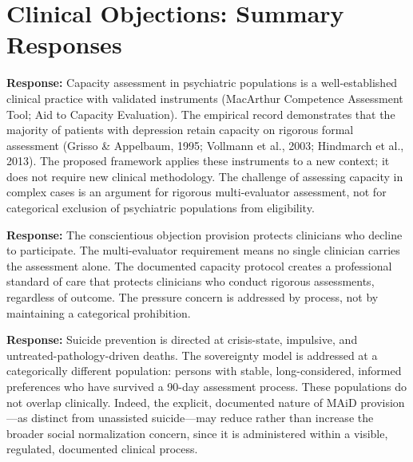 \documentclass[11pt, letterpaper]{article}
\begin{document}
\section{Clinical Objections: Summary Responses}

\begin{objectionbox}[title={\sffamily\bfseries\small\color{C@warning}
  ``We cannot assess capacity reliably in psychiatric populations''}]
\textbf{Response:} Capacity assessment in psychiatric populations is a well-established
clinical practice with validated instruments (MacArthur Competence Assessment Tool;
Aid to Capacity Evaluation). The empirical record demonstrates that the majority of
patients with depression retain capacity on rigorous formal assessment (Grisso \&
Appelbaum, 1995; Vollmann et al., 2003; Hindmarch et al., 2013). The proposed framework
applies these instruments to a new context; it does not require new clinical methodology.
The challenge of assessing capacity in complex cases is an argument for rigorous
multi-evaluator assessment, not for categorical exclusion of psychiatric populations
from eligibility.
\end{objectionbox}

\medskip

\begin{objectionbox}[title={\sffamily\bfseries\small\color{C@warning}
  ``Psychiatrists will face pressure to approve requests against their clinical judgment''}]
\textbf{Response:} The conscientious objection provision protects clinicians who
decline to participate. The multi-evaluator requirement means no single clinician
carries the assessment alone. The documented capacity protocol creates a professional
standard of care that protects clinicians who conduct rigorous assessments, regardless
of outcome. The pressure concern is addressed by process, not by maintaining a
categorical prohibition.
\end{objectionbox}

\medskip

\begin{objectionbox}[title={\sffamily\bfseries\small\color{C@warning}
  ``This will normalize suicide and undermine suicide prevention''}]
\textbf{Response:} Suicide prevention is directed at crisis-state, impulsive, and
untreated-pathology-driven deaths. The sovereignty model is addressed at a categorically
different population: persons with stable, long-considered, informed preferences who
have survived a 90-day assessment process. These populations do not overlap clinically.
Indeed, the explicit, documented nature of MAiD provision---as distinct from unassisted
suicide---may reduce rather than increase the broader social normalization concern,
since it is administered within a visible, regulated, documented clinical process.
\end{objectionbox}
\end{document}
